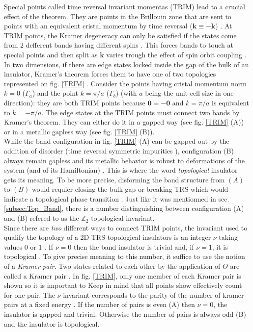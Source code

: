Special points called time reversal invariant momentas (TRIM) lead to a crucial effect of the theorem. They are points in the Brillouin zone that are sent to points with an equivalent cristal momentum by time reversal ($\mathbf{k} \equiv -\mathbf{k}$) \cite{kruthoff_topology_2019}. At TRIM points, the Kramer degeneracy can only be satisfied if the states come from $2$ defferent bands having different spins \cite{kruthoff_topology_2019}. This forces bands to touch at special points and then split as $\mathbf{k}$ varies trough the effect of spin orbit coupling \cite{kane_topological_2013}. In two dimensions, if there are edge states locked inside the gap of the bulk of an insulator, Kramer's theorem forces them to have one of two topologies represented on fig. \ref{TRIM} \cite{kane_topological_2013}. Consider the points having cristal momentum norm $k = 0$ ($\Gamma_a$) and the point $k = \pi/a$ ($\Gamma_b$) (with $a$ being the unit cell size in one direction): they are both TRIM points because $\mathbf{0} = - \mathbf{0}$ and $k = \pi/a$ is equivalent to $k = -\pi/a$. The edge states at the TRIM points must connect two bands by Kramer's theorem. They can either do it in a gapped way (see fig. \ref{TRIM} (A)) or in a metallic gapless way (see fig. \ref{TRIM} (B)).\\

While the band configuration in fig. \ref{TRIM} (A) can be gapped out by the addition of disorder (time reversal symmetric impurities \cite{asboth_short_2016}), configuration (B) always remain gapless and its metallic behavior is robust to deformations of the system (and of its Hamiltonian) \cite{cayssol_topological_2021}. This is where the word \textit{topological} insulator gets its meaning. To be more precise, disforming the band structure from $(A)$ to $(B)$ would requier closing the bulk gap or breaking TRS which would indicate a topological phase transition \cite{cayssol_topological_2021}. Just like it was mentionned in sec. \ref{subsec:Top_Band}, there is a number distinguishing between configuration (A) and (B) refered to as the $\mathbb{Z}_2$ topological invariant.\\

Since there are \textit{two} different ways to connect TRIM points, the invariant used to qualify the topology of a 2D TRS topological insulators is an integer $\nu$ taking values $0$ or $1$ \cite{bernevig_topological_2013}. If $\nu = 0$ then the band insulator is trivial and, if $\nu = 1$, it is topological \cite{cayssol_topological_2021}. To give precise meaning to this number, it suffice to use the notion of a \textit{Kramer pair}. Two states related to each other by the application of $\Theta$ are called a Kramer pair \cite{asboth_short_2016}. In fig. \ref{TRIM}, only one member of each Kramer pair is shown so it is important to Keep in mind that all points show effectively count for one pair. The $\nu$ invariant corresponds to the parity of the number of kramer pairs at a fixed energy \cite{asboth_short_2016}. If the number of pairs is even (A) then $\nu = 0$, the insulator is gapped and trivial. Otherwise the number of pairs is always odd (B) and the insulator is topological.

